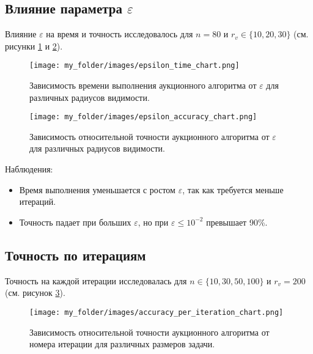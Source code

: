 \subsection{Влияние параметра \( \varepsilon \)}

\vspace{0.3cm}

Влияние \( \varepsilon \) на время и точность исследовалось для \( n = 80 \) и \( r_v \in \{10, 20, 30\} \) (см. рисунки \ref{fig:epsilon_time_chart} и \ref{fig:epsilon_accuracy_chart}).

\begin{figure}[h]
    \centering
    \texttt{[image: my\_folder/images/epsilon\_time\_chart.png]}
    \caption{Зависимость времени выполнения аукционного алгоритма от \( \varepsilon \) для различных радиусов видимости.}
    \label{fig:epsilon_time_chart}
\end{figure}

\begin{figure}[h]
    \centering
    \texttt{[image: my\_folder/images/epsilon\_accuracy\_chart.png]}
    \caption{Зависимость относительной точности аукционного алгоритма от \( \varepsilon \) для различных радиусов видимости.}
    \label{fig:epsilon_accuracy_chart}
\end{figure}

Наблюдения:
\begin{itemize}
    \item Время выполнения уменьшается с ростом \( \varepsilon \), так как требуется меньше итераций.
    \item Точность падает при больших \( \varepsilon \), но при \( \varepsilon \leq 10^{-2} \) превышает 90\%.
\end{itemize}

\subsection{Точность по итерациям}

\vspace{0.3cm}

Точность на каждой итерации исследовалась для \( n \in \{10, 30, 50, 100\} \) и \( r_v = 200 \) (см. рисунок \ref{fig:acc_per_iteration_chart}).

\begin{figure}[h]
    \centering
    \texttt{[image: my\_folder/images/accuracy\_per\_iteration\_chart.png]}
    \caption{Зависимость относительной точности аукционного алгоритма от номера итерации для различных размеров задачи.}
    \label{fig:acc_per_iteration_chart}
\end{figure}

